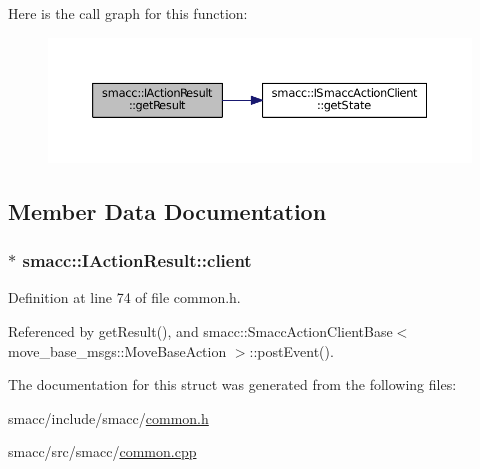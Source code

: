 Here is the call graph for this function\+:
\nopagebreak
\begin{figure}[H]
\begin{center}
\leavevmode
\includegraphics[width=350pt]{structsmacc_1_1IActionResult_a0c127144bfd0a844380533a95f133300_cgraph}
\end{center}
\end{figure}




\subsection{Member Data Documentation}
\subsubsection[{\texorpdfstring{client}{client}}]{$\ast$ smacc\+::\+I\+Action\+Result\+::client}\hypertarget{structsmacc_1_1IActionResult_a8768f186e223b75188025f318d156ee2}{}\label{structsmacc_1_1IActionResult_a8768f186e223b75188025f318d156ee2}


Definition at line 74 of file common.\+h.



Referenced by get\+Result(), and smacc\+::\+Smacc\+Action\+Client\+Base$<$ move\+\_\+base\+\_\+msgs\+::\+Move\+Base\+Action $>$\+::post\+Event().



The documentation for this struct was generated from the following files\+:\begin{DoxyCompactItemize}
\item 
smacc/include/smacc/\hyperlink{common_8h}{common.\+h}\item 
smacc/src/smacc/\hyperlink{common_8cpp}{common.\+cpp}\end{DoxyCompactItemize}
